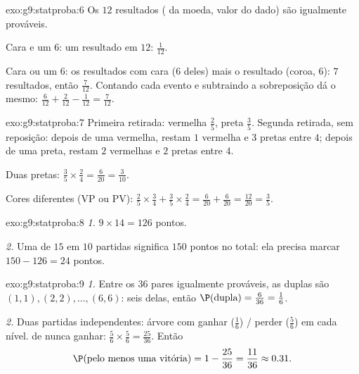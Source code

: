 \begin{solution}{exo:g9:statproba:6}
Os $12$ resultados ( da moeda, valor do dado) são igualmente
prováveis.

Cara e um $6$: um resultado em $12$: $\frac{1}{12}$.

Cara ou um $6$: os resultados com cara ($6$ deles) mais o resultado
(coroa, $6$): $7$ resultados, então $\frac{7}{12}$. Contando cada
evento e subtraindo a sobreposição dá o mesmo:
$\frac{6}{12} + \frac{2}{12} - \frac{1}{12} = \frac{7}{12}$.
\end{solution}

\begin{solution}{exo:g9:statproba:7}
Primeira retirada: vermelha $\frac25$, preta $\frac35$. Segunda
retirada, sem reposição: depois de uma vermelha, restam $1$ vermelha e
$3$ pretas entre $4$; depois de uma preta, restam $2$ vermelhas e $2$
pretas entre $4$.

Duas pretas: $\frac35 \times \frac24 = \frac{6}{20} = \frac{3}{10}$.

Cores diferentes (VP ou PV):
$\frac25 \times \frac34 + \frac35 \times \frac24
= \frac{6}{20} + \frac{6}{20} = \frac{12}{20} = \frac35$.
\end{solution}

\begin{solution}{exo:g9:statproba:8}
\emph{1.} $9 \times 14 = 126$ pontos.

\emph{2.} Uma  de $15$ em $10$ partidas significa $150$ pontos no
total: ela precisa marcar $150 - 126 = 24$ pontos.
\end{solution}

\begin{solution}{exo:g9:statproba:9}
\emph{1.} Entre os $36$ pares igualmente prováveis, as duplas são
$(1,1), (2,2), \dots, (6,6)$: seis delas, então
$\P(\text{dupla}) = \frac{6}{36} = \frac16$.

\emph{2.} Duas partidas independentes: árvore com ganhar ($\frac16$) /
perder ($\frac56$) em cada nível.  de nunca ganhar:
$\frac56 \times \frac56 = \frac{25}{36}$. Então
\[
\P(\text{pelo menos uma vitória}) = 1 - \frac{25}{36} = \frac{11}{36}
\approx 0.31 .
\]
\end{solution}

